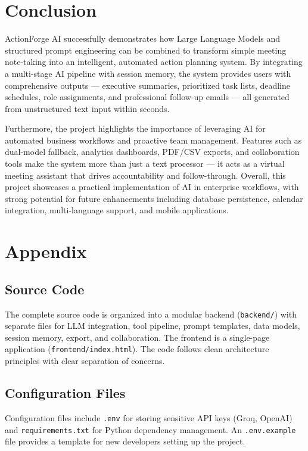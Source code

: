\documentclass[12pt,a4paper]{article}
\begin{document}
\section{Conclusion}

ActionForge AI successfully demonstrates how Large Language Models and structured prompt engineering can be combined to transform simple meeting note-taking into an intelligent, automated action planning system. By integrating a multi-stage AI pipeline with session memory, the system provides users with comprehensive outputs --- executive summaries, prioritized task lists, deadline schedules, role assignments, and professional follow-up emails --- all generated from unstructured text input within seconds.

Furthermore, the project highlights the importance of leveraging AI for automated business workflows and proactive team management. Features such as dual-model fallback, analytics dashboards, PDF/CSV exports, and collaboration tools make the system more than just a text processor --- it acts as a virtual meeting assistant that drives accountability and follow-through. Overall, this project showcases a practical implementation of AI in enterprise workflows, with strong potential for future enhancements including database persistence, calendar integration, multi-language support, and mobile applications.


\section{Appendix}

\subsection{Source Code}
The complete source code is organized into a modular backend (\texttt{backend/}) with separate files for LLM integration, tool pipeline, prompt templates, data models, session memory, export, and collaboration. The frontend is a single-page application (\texttt{frontend/index.html}). The code follows clean architecture principles with clear separation of concerns.

\subsection{Configuration Files}
Configuration files include \texttt{.env} for storing sensitive API keys (Groq, OpenAI) and \texttt{requirements.txt} for Python dependency management. An \texttt{.env.example} file provides a template for new developers setting up the project.
\end{document}
